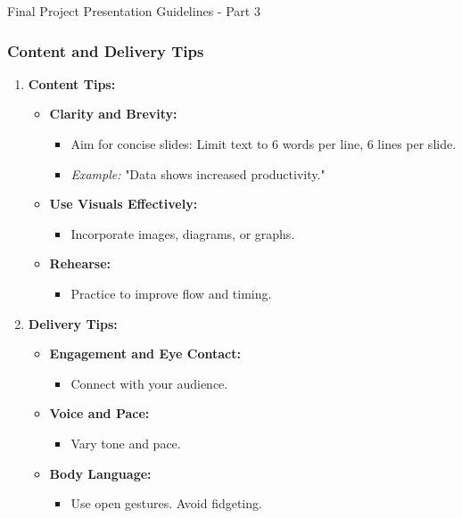 \documentclass[aspectratio=169]{beamer}
\begin{document}
\begin{frame}[fragile]{Final Project Presentation Guidelines - Part 3}
    \frametitle{Content and Delivery Tips}
    \begin{enumerate}
        \item \textbf{Content Tips:}
        \begin{itemize}
            \item \textbf{Clarity and Brevity:} 
            \begin{itemize}
                \item Aim for concise slides: Limit text to 6 words per line, 6 lines per slide.
                \item \textit{Example:} "Data shows increased productivity."
            \end{itemize}

            \item \textbf{Use Visuals Effectively:} 
            \begin{itemize}
                \item Incorporate images, diagrams, or graphs.
            \end{itemize}

            \item \textbf{Rehearse:} 
            \begin{itemize}
                \item Practice to improve flow and timing.
            \end{itemize}
        \end{itemize}

        \item \textbf{Delivery Tips:}
        \begin{itemize}
            \item \textbf{Engagement and Eye Contact:} 
            \begin{itemize}
                \item Connect with your audience.
            \end{itemize}

            \item \textbf{Voice and Pace:} 
            \begin{itemize}
                \item Vary tone and pace.
            \end{itemize}

            \item \textbf{Body Language:} 
            \begin{itemize}
                \item Use open gestures. Avoid fidgeting.
            \end{itemize}
        \end{itemize}
    \end{enumerate}
\end{frame}
\end{document}
